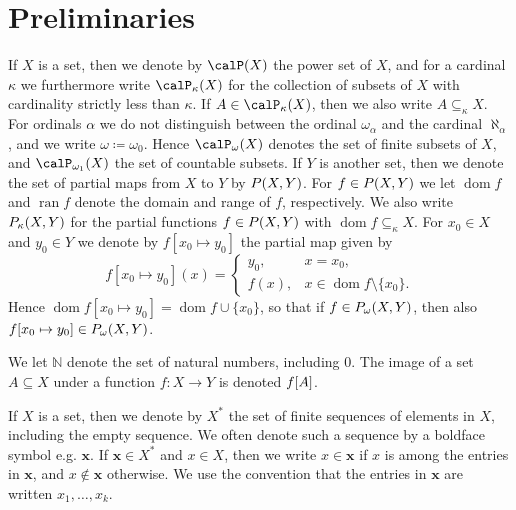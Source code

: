 \documentclass[a4paper, 11pt, article, danish, oneside]{memoir}
\title{\doctitle}
\author{\docauthor}
\newcommand{\naturals}{\mathbb{N}}
\DeclarePairedDelimiter{\auxdelimparen}{(}{)}
\DeclarePairedDelimiter{\auxdelimbracket}{[}{]}
\newcommand{\powerset}[2][]{\calP\auxdelimparen[#1]{#2}}
\newcommand{\powersetcard}[3][]{\calP_{#2}\auxdelimparen[#1]{#3}}
\newcommand{\powersetfin}[2][]{\powersetcard[#1]{\omega}{#2}}
\newcommand{\powersetcount}[2][]{\powersetcard[#1]{\omega_1}{#2}}
\newcommand*\union\cup
\newcommand{\defeq}{\coloneqq}
\newcommand{\image}[2][]{\auxdelimbracket[#1]{#2}}
\newcommand{\dom}{\operatorname{dom}}
\newcommand{\ran}{\operatorname{ran}}
\newcommand{\pmaps}[3][]{%
    \ifstrempty{#1}%
        {%
            P(#2,#3)
        }{%
            P_{#1}(#2,#3)
        }%
}
\begin{document}
\maketitle


\chapter{Preliminaries}

If $X$ is a set, then we denote by $\powerset{X}$ the power set of $X$, and for a cardinal $\kappa$ we furthermore write $\powersetcard{\kappa}{X}$ for the collection of subsets of $X$ with cardinality strictly less than $\kappa$. If $A \in \powersetcard{\kappa}{X}$, then we also write $A \subseteq_\kappa X$. For ordinals $\alpha$ we do not distinguish between the ordinal $\omega_\alpha$ and the cardinal $\aleph_\alpha$, and we write $\omega \defeq \omega_0$. Hence $\powersetfin{X}$ denotes the set of finite subsets of $X$, and $\powersetcount{X}$ the set of countable subsets. If $Y$ is another set, then we denote the set of partial maps from $X$ to $Y$ by $\pmaps{X}{Y}$. For $f \in \pmaps{X}{Y}$ we let $\dom f$ and $\ran f$ denote the domain and range of $f$, respectively. We also write $\pmaps[\kappa]{X}{Y}$ for the partial functions $f \in \pmaps{X}{Y}$ with $\dom f \subseteq_\kappa X$. For $x_0 \in X$ and $y_0 \in Y$ we denote by $f[x_0 \mapsto y_0]$ the partial map given by
%
\begin{equation*}
    f[x_0 \mapsto y_0](x) =
    \begin{cases}
        y_0, & x = x_0, \\
        f(x), & x \in \dom f \setminus \{x_0\}.
    \end{cases}
\end{equation*}
%
Hence $\dom f[x_0 \mapsto y_0] = \dom f \union \{x_0\}$, so that if $f \in \pmaps[\omega]{X}{Y}$, then also $f[x_0 \mapsto y_0] \in \pmaps[\omega]{X}{Y}$.

We let $\naturals$ denote the set of natural numbers, including $0$. The image of a set $A \subseteq X$ under a function $f \colon X \to Y$ is denoted $f\image{A}$.

\newcommand{\seq}[1]{\bm{#1}}
\newcommand{\setOp}{\calO}
\newcommand{\setSort}{\calS}
\newcommand{\sortExp}{\mathit{Exp}}
\newcommand{\sortType}{\mathit{Type}}
\newcommand{\finseq}[1]{#1^*}
\newcommand{\disj}{\mathbin{\#}}

If $X$ is a set, then we denote by $\finseq{X}$ the set of finite sequences of elements in $X$, including the empty sequence. We often denote such a sequence by a boldface symbol e.g. $\seq{x}$. If $\seq{x} \in \finseq{X}$ and $x \in X$, then we write $x \in \seq{x}$ if $x$ is among the entries in $\seq{x}$, and $x \not\in \seq{x}$ otherwise. We use the convention that the entries in $\seq{x}$ are written $x_1, \ldots, x_k$.
\end{document}
